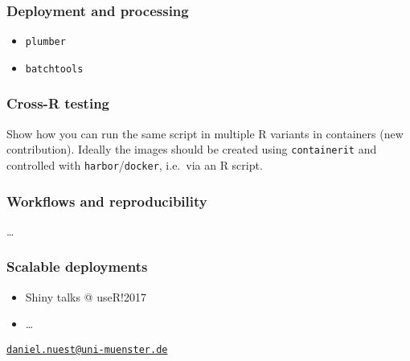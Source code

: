\subsubsection{Deployment and
processing}\label{deployment-and-processing}

\begin{itemize}
\tightlist
\item
  \texttt{plumber}
\item
  \texttt{batchtools}
\end{itemize}

\subsubsection{Cross-R testing}\label{cross-r-testing}

Show how you can run the same script in multiple R variants in
containers (new contribution). Ideally the images should be created
using \texttt{containerit} and controlled with
\texttt{harbor}/\texttt{docker}, i.e.~via an R script.

\subsubsection{Workflows and
reproducibility}\label{workflows-and-reproducibility}

\ldots{}

\subsubsection{Scalable deployments}\label{scalable-deployments}

\begin{itemize}
\tightlist
\item
  Shiny talks @ useR!2017
\item
  \ldots{}
\end{itemize}



\address{%
Daniel Nüst\\
Institute for Geoinformatics, University of Münster\\
Heisenbergstr. 2, 48149 Münster, Germany\\
}
\href{mailto:daniel.nuest@uni-muenster.de}{\nolinkurl{daniel.nuest@uni-muenster.de}}

